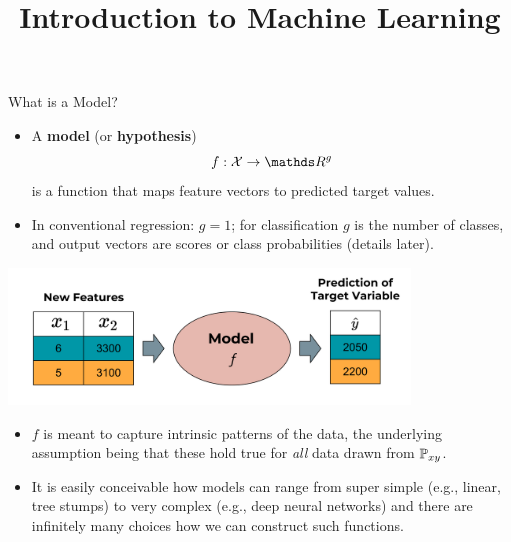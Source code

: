 \documentclass[11pt,compress,t,notes=noshow, xcolor=table]{beamer}
\title{Introduction to Machine Learning}
\date{}
\begin{document}


\begin{vbframe}{What is a Model?}

\begin{itemize}

  \item A \textbf{model} (or \textbf{hypothesis}) 
  $$f : \Xspace \rightarrow \R^g$$ 
  is a function that maps feature vectors to predicted target values.

\item In conventional regression: $g = 1$; for 
classification $g$ is the number of classes, and output vectors are scores 
or class probabilities (details later).
  
  
\end{itemize}

\begin{center}
  \includegraphics[width = 0.8\textwidth]{figure_man/the_model_web} 
\end{center}
  

\framebreak

\begin{itemize}

  \item $f$ is meant to capture intrinsic patterns of the data, the
  underlying assumption being that these hold true for \emph{all} data drawn 
  from $\mathbb{P}_{xy}$.
  
  \item It is easily conceivable how models can range from super simple (e.g., 
   linear, tree stumps) to very complex (e.g., deep neural networks) and there
   are infinitely many choices how we can construct such functions.
  

\end{itemize}
\end{vbframe}
\end{document}
